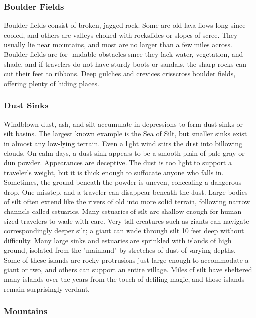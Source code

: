 \begin{multicols}{2}

\subsubsection{Boulder Fields}

Boulder fields consist of broken, jagged rock. Some are old lava flows long
since cooled, and others are valleys choked with rockslides or slopes of scree.
They usually lie near mountains, and most are no larger than a few miles across.
Boulder fields are for- midable obstacles since they lack water, vegetation,
and shade, and if travelers do not have sturdy boots or sandals, the sharp
rocks can cut their feet to ribbons. Deep gulches and crevices crisscross
boulder fields, offering plenty of hiding places.

\subsubsection{Dust Sinks}

Windblown dust, ash, and silt accumulate in depressions to form dust sinks or
silt basins. The largest known example is the Sea of Silt, but smaller sinks
exist in almost any low-lying terrain. Even a light wind stirs the dust into
billowing clouds. On calm days, a dust sink appears to be a smooth plain of
pale gray or dun powder. Appearances are deceptive. The dust is too light to
support a traveler's weight, but it is thick enough to suffocate anyone who
falls in. Sometimes, the ground beneath the powder is uneven, concealing a
dangerous drop. One misstep, and a traveler can disappear beneath the dust.
Large bodies of silt often extend like the rivers of old into more solid
terrain, following narrow channels called estuaries. Many estuaries of silt
are shallow enough for human-sized travelers to wade with care. Very tall
creatures such as giants can navigate correspondingly deeper silt; a giant
can wade through silt 10 feet deep without difficulty. Many large sinks and
estuaries are sprinkled with islands of high ground, isolated from the
"mainland" by stretches of dust of varying depths. Some of these islands are
rocky protrusions just large enough to accommodate a giant or two, and others
can support an entire village. Miles of silt have sheltered many islands over
the years from the touch of defiling magic, and those islands remain
surprisingly verdant.

\subsubsection{Mountains}


\end{multicols}
